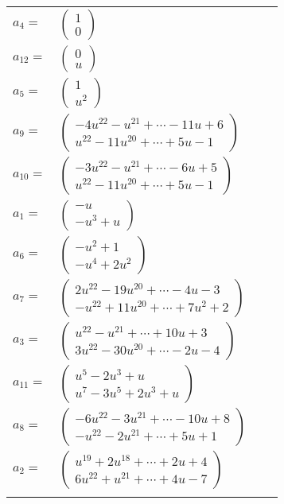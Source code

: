 \documentclass[1p]{elsarticle_modified}
\theoremstyle{definition}
\begin{document}
\begin{tabular}{m{7pt} m{180pt} m{7pt} m{180pt} }
\flushright $a_{4}=$&$\begin{pmatrix}1\\0\end{pmatrix}$ \\
\flushright $a_{12}=$&$\begin{pmatrix}0\\u\end{pmatrix}$ \\
\flushright $a_{5}=$&$\begin{pmatrix}1\\u^2\end{pmatrix}$ \\
\flushright $a_{9}=$&$\begin{pmatrix}-4 u^{22}- u^{21}+\cdots-11 u+6\\u^{22}-11 u^{20}+\cdots+5 u-1\end{pmatrix}$ \\
\flushright $a_{10}=$&$\begin{pmatrix}-3 u^{22}- u^{21}+\cdots-6 u+5\\u^{22}-11 u^{20}+\cdots+5 u-1\end{pmatrix}$ \\
\flushright $a_{1}=$&$\begin{pmatrix}- u\\- u^3+u\end{pmatrix}$ \\
\flushright $a_{6}=$&$\begin{pmatrix}- u^2+1\\- u^4+2 u^2\end{pmatrix}$ \\
\flushright $a_{7}=$&$\begin{pmatrix}2 u^{22}-19 u^{20}+\cdots-4 u-3\\- u^{22}+11 u^{20}+\cdots+7 u^2+2\end{pmatrix}$ \\
\flushright $a_{3}=$&$\begin{pmatrix}u^{22}- u^{21}+\cdots+10 u+3\\3 u^{22}-30 u^{20}+\cdots-2 u-4\end{pmatrix}$ \\
\flushright $a_{11}=$&$\begin{pmatrix}u^5-2 u^3+u\\u^7-3 u^5+2 u^3+u\end{pmatrix}$ \\
\flushright $a_{8}=$&$\begin{pmatrix}-6 u^{22}-3 u^{21}+\cdots-10 u+8\\- u^{22}-2 u^{21}+\cdots+5 u+1\end{pmatrix}$ \\
\flushright $a_{2}=$&$\begin{pmatrix}u^{19}+2 u^{18}+\cdots+2 u+4\\6 u^{22}+u^{21}+\cdots+4 u-7\end{pmatrix}$\\&\end{tabular}
\end{document}
